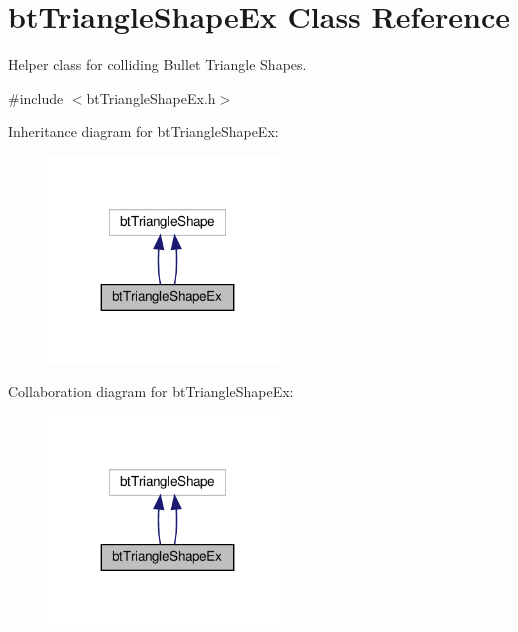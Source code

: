 \hypertarget{classbtTriangleShapeEx}{}\section{bt\+Triangle\+Shape\+Ex Class Reference}
\label{classbtTriangleShapeEx}


Helper class for colliding Bullet Triangle Shapes.  




{\ttfamily \#include $<$bt\+Triangle\+Shape\+Ex.\+h$>$}



Inheritance diagram for bt\+Triangle\+Shape\+Ex\+:
\nopagebreak
\begin{figure}[H]
\begin{center}
\leavevmode
\includegraphics[width=179pt]{classbtTriangleShapeEx__inherit__graph}
\end{center}
\end{figure}


Collaboration diagram for bt\+Triangle\+Shape\+Ex\+:
\nopagebreak
\begin{figure}[H]
\begin{center}
\leavevmode
\includegraphics[width=179pt]{classbtTriangleShapeEx__coll__graph}
\end{center}
\end{figure}
